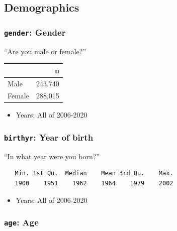 \documentclass[10pt,article,oneside]{memoir}
\theoremstyle{definition}
\begin{document}
\newpage

\hypertarget{demographics}{%
\subsection{Demographics}\label{demographics}}

\hypertarget{gender-gender}{%
\subsubsection{\texorpdfstring{\texttt{gender}:
Gender}{gender: Gender}}\label{gender-gender}}

``Are you male or female?''

\begin{table}[H]
\centering
\begin{tabular}[t]{lr}
\toprule
 & n\\
\midrule
Male & 243,740\\
Female & 288,015\\
\bottomrule
\end{tabular}
\end{table}

\begin{itemize}
\tightlist
\item
  Years: All of 2006-2020
\end{itemize}

\hypertarget{birthyr-year-of-birth}{%
\subsubsection{\texorpdfstring{\texttt{birthyr}: Year of
birth}{birthyr: Year of birth}}\label{birthyr-year-of-birth}}

``In what year were you born?''

\begin{verbatim}
   Min. 1st Qu.  Median    Mean 3rd Qu.    Max. 
   1900    1951    1962    1964    1979    2002 
\end{verbatim}

\begin{itemize}
\tightlist
\item
  Years: All of 2006-2020
\end{itemize}

\hypertarget{age-age}{%
\subsubsection{\texorpdfstring{\texttt{age}:
Age}{age: Age}}\label{age-age}}
\end{document}
